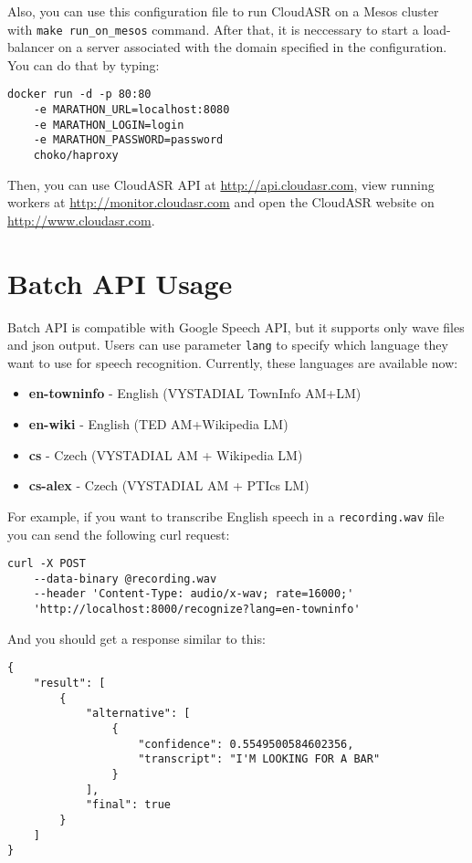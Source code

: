 Also, you can use this configuration file to run CloudASR on a Mesos cluster with \texttt{make run\_on\_mesos} command.
After that, it is neccessary to start a load-balancer on a server associated with the domain specified in the configuration.
You can do that by typing:

\begin{verbatim}
docker run -d -p 80:80
    -e MARATHON_URL=localhost:8080
    -e MARATHON_LOGIN=login
    -e MARATHON_PASSWORD=password
    choko/haproxy
\end{verbatim}

Then, you can use CloudASR API at \url{http://api.cloudasr.com},
  view running workers at \url{http://monitor.cloudasr.com}
  and open the CloudASR website on \url{http://www.cloudasr.com}.


\section{Batch API Usage}

Batch API is compatible with Google Speech API, but it supports only wave files and json output.
Users can use parameter \texttt{lang} to specify which language they want to use for speech recognition.
Currently, these languages are available now:

\begin{itemize}
\item
    \textbf{en-towninfo} - English (VYSTADIAL TownInfo AM+LM)
\item
    \textbf{en-wiki} - English (TED AM+Wikipedia LM)
\item
    \textbf{cs} - Czech (VYSTADIAL AM + Wikipedia LM)
\item
    \textbf{cs-alex} - Czech (VYSTADIAL AM + PTIcs LM)
\end{itemize}

For example, if you want to transcribe English speech in a \texttt{recording.wav} file you can send the following curl request:

\begin{verbatim}
curl -X POST
    --data-binary @recording.wav
    --header 'Content-Type: audio/x-wav; rate=16000;'
    'http://localhost:8000/recognize?lang=en-towninfo'
\end{verbatim}


And you should get a response similar to this:

\begin{verbatim}
{
    "result": [
        {
            "alternative": [
                {
                    "confidence": 0.5549500584602356,
                    "transcript": "I'M LOOKING FOR A BAR"
                }
            ],
            "final": true
        }
    ]
}
\end{verbatim}


